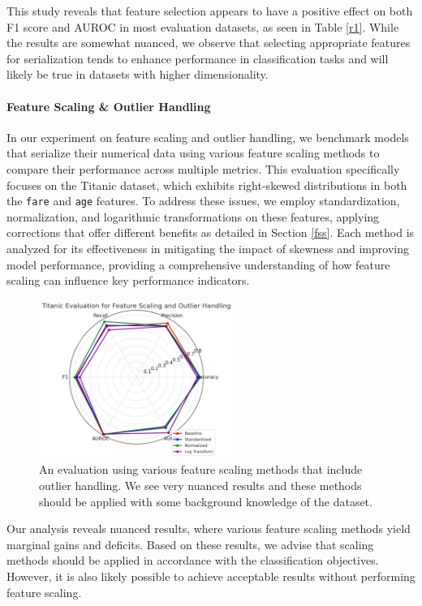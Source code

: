 \documentclass{article}
\theoremstyle{plain}
\theoremstyle{definition}
\theoremstyle{remark}
\begin{document}
This study reveals that feature selection appears to have a positive effect on both F1 score and AUROC in most evaluation datasets, as seen in Table \ref{r1}. While the results are somewhat nuanced, we observe that selecting appropriate features for serialization tends to enhance performance in classification tasks and will likely be true in datasets with higher dimensionality.

\paragraph{Feature Scaling \& Outlier Handling} In our experiment on feature scaling and outlier handling, we benchmark models that serialize their numerical data using various feature scaling methods to compare their performance across multiple metrics. This evaluation specifically focuses on the Titanic dataset, which exhibits right-skewed distributions in both the \texttt{fare} and \texttt{age} features. To address these issues, we employ standardization, normalization, and logarithmic transformations on these features, applying corrections that offer different benefits as detailed in Section \ref{fss}. Each method is analyzed for its effectiveness in mitigating the impact of skewness and improving model performance, providing a comprehensive understanding of how feature scaling can influence key performance indicators.

\begin{figure}[h!]
    \centering
    \includegraphics[width=2.5in]{fs.png}
    \caption{An evaluation using various feature scaling methods that include outlier handling. We see very nuanced results and these methods should be applied with some background knowledge of the dataset.}
    \label{shap}
\end{figure}
\vspace{-0.1cm}
Our analysis reveals nuanced results, where various feature scaling methods yield marginal gains and deficits. Based on these results, we advise that scaling methods should be applied in accordance with the classification objectives. However, it is also likely possible to achieve acceptable results without performing feature scaling.
\vspace{-0.2cm}
\end{document}
